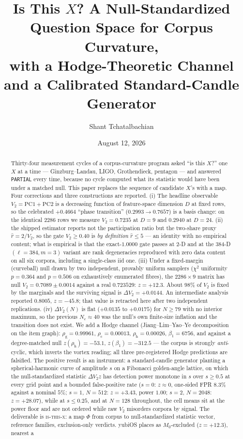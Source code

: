 \documentclass[11pt,a4paper]{article}
\title{Is This $X$? A Null-Standardized Question Space for Corpus Curvature,\\
  {\large with a Hodge-Theoretic Channel and a Calibrated Standard-Candle Generator}}
\author{Shant Tchatalbachian}
\date{August 12, 2026}
\theoremstyle{plain}
\theoremstyle{remark}
\theoremstyle{plain}
\begin{document}
\maketitle

\begin{abstract}
Thirty-four measurement cycles of a corpus-curvature program asked ``is this $X$?'' one $X$ at a time --- Ginzburg--Landau, LIGO, Grothendieck, pentagon --- and answered \texttt{PARTIAL} every time, because no cycle computed what its statistic would have been under a matched null. This paper replaces the sequence of candidate $X$'s with a map. Four corrections and three constructions are reported. (i) The headline observable $V_2=\mathrm{PC1}+\mathrm{PC2}$ is a decreasing function of feature-space dimension $D$ at fixed rows, so the celebrated $+0.4664$ ``phase transition'' ($0.2993\to0.7657$) is a basis change: on the identical $2286$ rows we measure $V_2=0.7235$ at $D=9$ and $0.2940$ at $D=24$. (ii) the shipped estimator reports not the participation ratio but the two-share proxy $\hat r=2/V_2$, so the gate $V_2\ge0.40$ is \emph{by definition} $\hat r\le5$ --- an identity with no empirical content; what is empirical is that the exact-$1.0000$ gate passes at $2$-D and at the $384$-D $(\ell{=}384,m{=}3)$ variant are rank degeneracies reproduced with zero data content on all six corpora, including a single-class iid one. (iii) Under a fixed-margin (curveball) null drawn by two independent, provably uniform samplers ($\chi^2$ uniformity $p=0.364$ and $p=0.506$ on exhaustively enumerated fibres), the $2286\times9$ matrix has null $V_2=0.7089\pm0.0014$ against a real $0.723529$: $z=+12.3$. About $98\%$ of $V_2$ is fixed by the marginals and the surviving signal is $\Delta V_2=+0.0144$. An intermediate analysis reported $0.8005$, $z=-45.8$; that value is retracted here after two independent replications. (iv) $\Delta V_2(N)$ is flat ($+0.0135$ to $+0.0175$) for $N\ge79$ with no interior maximum, so the previous $N_c\approx40$ was the null's own finite-size inflation and the transition does not exist. We add a Hodge channel (Jiang--Lim--Yao--Ye decomposition on the item graph): $\rho_{\mathrm g}=0.99961$, $\rho_{\mathrm c}=0.00013$, $\rho_{\mathrm h}=0.00026$, $\beta_1=6756$, and against a degree-matched null $z(\rho_{\mathrm h})=-53.1$, $z(\beta_1)=-312.5$ --- the corpus is strongly \emph{anti}-cyclic, which inverts the vortex reading; all three pre-registered Hodge predictions are falsified. The positive result is an instrument: a standard-candle generator planting a spherical-harmonic curve of amplitude $s$ on a Fibonacci golden-angle lattice, on which the null-standardized statistic $\Delta V_2z$ has detection power monotone in $s$ over $s\ge0.5$ at every grid point and a bounded false-positive rate ($s{=}0$: $z\approx0$, one-sided FPR $8.3\%$ against a nominal $5\%$; $s{=}1$, $N{=}512$: $z=+3.43$, power $1.00$; $s{=}2$, $N{=}2048$: $z=+28.07$), while at $s\le0.25$, and at $N=128$ throughout, the cell means sit at the power floor and are not ordered while raw $V_2$ misorders corpora by signal. The deliverable is \textsc{is-this-x}: a map $\Phi$ from corpus to null-standardized statistic vector, reference families, exclusion-only verdicts. yubiOS places as $M_0$-excluded ($z=+12.3$), nearest a 
\end{abstract}
\end{document}
